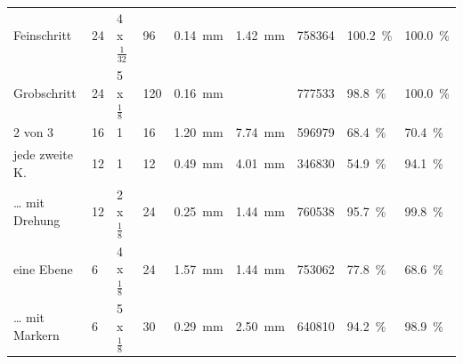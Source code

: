 \documentclass[./00PhotoBox.tex]{subfiles}
\begin{document}
\begin{table}
{\begin{tabular}{l|l|l|l|l|l|l|l|l}
            Feinschritt    & 24                                                                & 4 x $\frac{1}{32}$       & 96                       & \SI{0,14}{\milli\metre}                                             & \SI{1,42}{\milli\metre}                                             & 758364               & \SI{100,2}{\percent}                       & \SI{100,0}{\percent}                       \\
            Grobschritt    & 24                                                                & 5 x $\frac{1}{8}$        & 120                      & \SI{0,16}{\milli\metre}                                             & \cellcolor[HTML]{EEEEEE}                                            & 777533               & \SI{98,8}{\percent}                        & \SI{100,0}{\percent}                       \\ \hline
            2 von 3        & 16                                                                & 1                        & 16                       & {\color[HTML]{FF0000} \SI{1,20}{\milli\metre}}                      & {\color[HTML]{FF0000} \SI{7,74}{\milli\metre}}                      & 596979               & {\color[HTML]{FF0000} \SI{68,4}{\percent}} & {\color[HTML]{FF0000} \SI{70,4}{\percent}} \\ \hline
            jede zweite K. & 12                                                                & 1                        & 12                       & \SI{0,49}{\milli\metre}                                             & \SI{4,01}{\milli\metre}                                             & 346830               & {\color[HTML]{FF0000} \SI{54,9}{\percent}} & \SI{94,1}{\percent}                        \\
            … mit Drehung  & 12                                                                & 2 x $\frac{1}{8}$        & 24                       & \SI{0,25}{\milli\metre}                                             & \SI{1,44}{\milli\metre}                                             & 760538               & \SI{95,7}{\percent}                        & \SI{99,8}{\percent}                        \\ \hline
            eine Ebene     & 6                                                                 & 4 x $\frac{1}{8}$        & 24                       & {\color[HTML]{FF0000} \SI{1,57}{\milli\metre}}                      & \SI{1,44}{\milli\metre}                                             & 753062               & {\color[HTML]{FF0000} \SI{77,8}{\percent}} & {\color[HTML]{FF0000} \SI{68,6}{\percent}} \\
            … mit Markern  & 6                                                                 & 5 x $\frac{1}{8}$        & 30                       & \SI{0,29}{\milli\metre}                                             & \SI{2,50}{\milli\metre}                                             & 640810               & \SI{94,2}{\percent}                        & \SI{98,9}{\percent}
        \end{tabular}
    }
\end{table}
\end{document}
